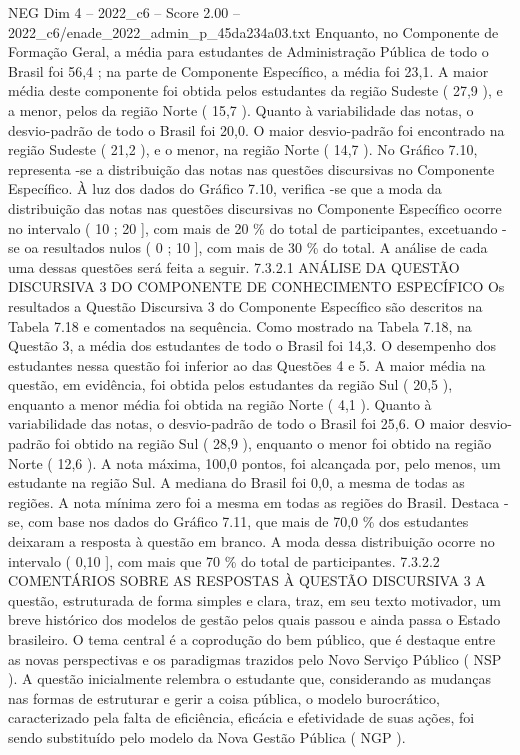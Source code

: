 \begin{textsample}{NEG Dim 4 – 2022\_c6 – Score 2.00 – 2022\_c6/enade\_2022\_admin\_p\_45da234a03.txt}
Enquanto, no Componente de Formação Geral, a média para estudantes de Administração Pública de todo o Brasil foi 56,4 ; na parte de Componente Específico, a média foi 23,1.
A maior média deste componente foi obtida pelos estudantes da região Sudeste ( 27,9 ), e a menor, pelos da região Norte ( 15,7 ).
Quanto à variabilidade das notas, o desvio-padrão de todo o Brasil foi 20,0.
O maior desvio-padrão foi encontrado na região Sudeste ( 21,2 ), e o menor, na região Norte ( 14,7 ).
No Gráfico 7.10, representa -se a distribuição das notas nas questões discursivas no Componente Específico.
À luz dos dados do Gráfico 7.10, verifica -se que a moda da distribuição das notas nas questões discursivas no Componente Específico ocorre no intervalo ( 10 ; 20 ], com mais de 20 \% do total de participantes, excetuando -se oa resultados nulos ( 0 ; 10 ], com mais de 30 \% do total.
A análise de cada uma dessas questões será feita a seguir. 7.3.2.1 ANÁLISE DA QUESTÃO DISCURSIVA 3 DO COMPONENTE DE CONHECIMENTO ESPECÍFICO Os resultados a Questão Discursiva 3 do Componente Específico são descritos na Tabela 7.18 e comentados na sequência.
Como mostrado na Tabela 7.18, na Questão 3, a média dos estudantes de todo o Brasil foi 14,3.
O desempenho dos estudantes nessa questão foi inferior ao das Questões 4 e 5.
A maior média na questão, em evidência, foi obtida pelos estudantes da região Sul ( 20,5 ), enquanto a menor média foi obtida na região Norte ( 4,1 ).
Quanto à variabilidade das notas, o desvio-padrão de todo o Brasil foi 25,6.
O maior desvio-padrão foi obtido na região Sul ( 28,9 ), enquanto o menor foi obtido na região Norte ( 12,6 ).
A nota máxima, 100,0 pontos, foi alcançada por, pelo menos, um estudante na região Sul.
A mediana do Brasil foi 0,0, a mesma de todas as regiões.
A nota mínima zero foi a mesma em todas as regiões do Brasil.
Destaca -se, com base nos dados do Gráfico 7.11, que mais de 70,0 \% dos estudantes deixaram a resposta à questão em branco.
A moda dessa distribuição ocorre no intervalo ( 0,10 ], com mais que 70 \% do total de participantes. 7.3.2.2 COMENTÁRIOS SOBRE AS RESPOSTAS À QUESTÃO DISCURSIVA 3 A questão, estruturada de forma simples e clara, traz, em seu texto motivador, um breve histórico dos modelos de gestão pelos quais passou e ainda passa o Estado brasileiro.
O tema central é a coprodução do bem público, que é destaque entre as novas perspectivas e os paradigmas trazidos pelo Novo Serviço Público ( NSP ).
A questão inicialmente relembra o estudante que, considerando as mudanças nas formas de estruturar e gerir a coisa pública, o modelo burocrático, caracterizado pela falta de eficiência, eficácia e efetividade de suas ações, foi sendo substituído pelo modelo da Nova Gestão Pública ( NGP ).

\end{textsample}
